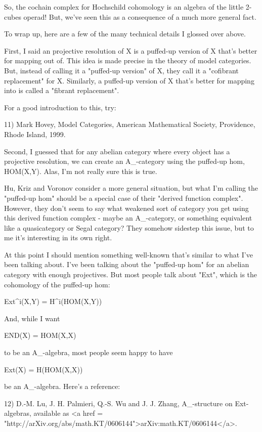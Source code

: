 So, the cochain complex for Hochschild cohomology is an algebra of 
the little 2-cubes operad!  But, we've seen this as a consequence 
of a much more general fact.

To wrap up, here are a few of the many technical details I glossed
over above.

First, I said an projective resolution of X is a puffed-up version of X
that's better for mapping out of.  This idea is made precise in the
theory of model categories.  But, instead of calling it a
"puffed-up version" of X, they call it a "cofibrant
replacement" for X.  Similarly, a puffed-up version of X that's
better for mapping into is called a "fibrant replacement".

For a good introduction to this, try:

11) Mark Hovey, Model Categories, American Mathematical Society,
Providence, Rhode Island, 1999.

Second, I guessed that for any abelian category where every object has
a projective resolution, we can create an A_{\infty }-category
using the puffed-up hom, HOM(X,Y).  Alas, I'm not really sure this is true.

Hu, Kriz and Voronov consider a more general situation, but
what I'm calling the "puffed-up hom" should be a special case of their
"derived function complex".  However, they don't seem to say
what weakened sort of category you get using this
derived function complex - maybe an A_{\infty }-category, or
something equivalent like a quasicategory or Segal category?  They
somehow sidestep this issue, but to me it's interesting in its
own right.

At this point I should mention something well-known that's similar
to what I've been talking about.  I've been talking about the 
"puffed-up hom" for an abelian category with enough projectives.   
But most people talk about "Ext", which is the cohomology of the 
puffed-up hom:

Ext^{i}(X,Y) = H^{i}(HOM(X,Y))

And, while I want 

END(X) = HOM(X,X) 

to be an A_{\infty }-algebra, most people seem happy to have

Ext(X) = H(HOM(X,X))

be an A_{\infty }-algebra.  Here's a reference:

12) D.-M. Lu, J. H. Palmieri, Q.-S. Wu and J. J. Zhang,
A_{\infty }-structure on Ext-algebras, available as 
<a href = "http://arXiv.org/abs/math.KT/0606144">arXiv:math.KT/0606144</a>.

